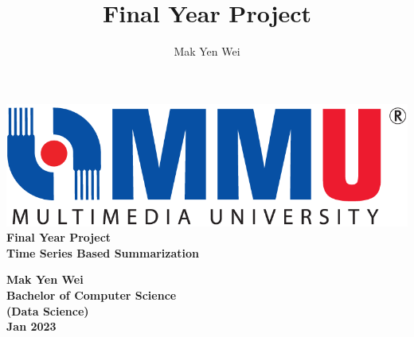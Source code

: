 \documentclass{mmuthesis}
\author{Mak Yen Wei}
\title{Final Year Project}
\begin{document}
\begin{titlingpage}
\begin{center}
\includegraphics[scale=0.30]{mmu.png}\\


\vspace{2.5cm}
\Large{\textbf{Final Year Project}} \\
\vspace{1cm}
\Large{\textbf{Time Series Based Summarization}} \\
\vspace{1cm}
 
\vspace{3.0cm}

\large{\textbf{Mak Yen Wei}} \\ 
\vspace{4.0cm}
\large{\textbf{Bachelor of Computer Science}} \\ 
\large{\textbf{(Data Science)}} \\ 
\vspace{0.5cm}
\large{\textbf{Jan 2023}} \\ 

\end{center}
\end{titlingpage}



{\clearpage\SingleSpacing
\tableofcontents\clearpage
}


\mainmatter 
  
  
  
% 
% 
% 

% 
% 

\backmatter


\end{document}
